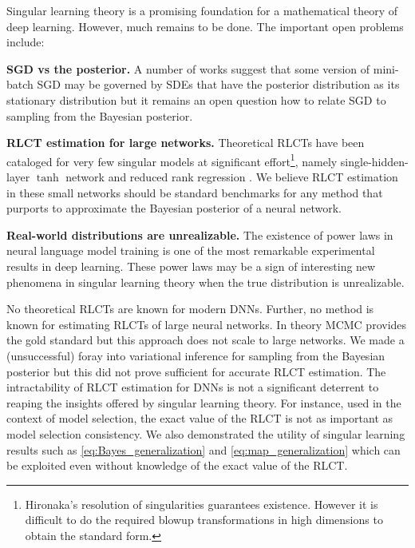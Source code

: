 \documentclass{article} %
\begin{document}
Singular learning theory is a promising foundation for a mathematical theory of deep learning. However, much remains to be done. The important open problems include:

\textbf{SGD vs the posterior.} A number of works \citep{Simsekli17,mandt_stochastic_2018,smith_stochastic_2018} suggest that some version of mini-batch SGD may be governed by SDEs that have the posterior distribution as its stationary distribution but it remains an open question how to relate SGD to sampling from the Bayesian posterior. %

\textbf{RLCT estimation for large networks.} 
Theoretical RLCTs have been cataloged for very few singular models at significant effort\footnote{Hironaka's resolution of singularities guarantees existence. However it is difficult to do the required blowup transformations in high dimensions to obtain the standard form.}, namely single-hidden-layer $\tanh$ network \citep{aoyagi_resolution_2006} and reduced rank regression \citep{aoyagi_stochastic_2005}. We believe RLCT estimation in these small networks should be standard benchmarks for any method that purports to approximate the Bayesian posterior of a neural network.

\textbf{Real-world distributions are unrealizable.}
The existence of power laws in neural language model training \citep{hestness_2017,kaplan2020scaling} is one of the most remarkable experimental results in deep learning. These power laws may be a sign of interesting new phenomena in singular learning theory when the true distribution is unrealizable.

No theoretical RLCTs are known for modern DNNs.
Further, no method is known for estimating RLCTs of large neural networks. In theory MCMC provides the gold standard but this approach does not scale to large networks. We made a (unsuccessful) foray into variational inference for sampling from the Bayesian posterior but this did not prove sufficient for accurate RLCT estimation. 
The intractability of RLCT estimation for DNNs is not a significant deterrent to reaping the insights offered by singular learning theory. For instance, used in the context of model selection, the exact value of the RLCT is not as important as model selection consistency. We also demonstrated the utility of singular learning results such as \eqref{eq:Bayes_generalization} and \eqref{eq:map_generalization} which can be exploited even without knowledge of the exact value of the RLCT.
\end{document}

